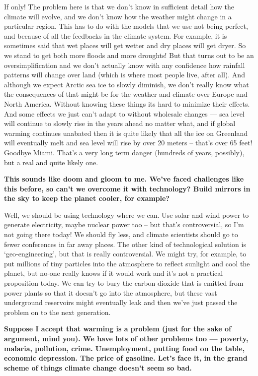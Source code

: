 \documentclass[11pt]{article}
\begin{document}
If only! The problem here is that we don't know in sufficient detail how
the climate will evolve, and we don't know how the weather might change
in a particular region. This has to do with the models that we use not
being perfect, and because of all the feedbacks in the climate system.
For example, it is sometimes said that wet places will get wetter and
dry places will get dryer. So we stand to get both more floods and more
droughts! But that turns out to be an oversimplification and we don't
actually know with any confidence how rainfall patterns will change over
land (which is where most people live, after all). And although we
expect Arctic sea ice to slowly diminish, we don't really know what the
consequences of that might be for the weather and climate over Europe
and North America. Without knowing these things its hard to minimize
their effects. And some effects we just can't adapt to without wholesale
changes --- sea level will continue to slowly rise in the years ahead no
matter what, and if global warming continues unabated then it is quite
likely that all the ice on Greenland will eventually melt and sea level
will rise by over 20 meters -- that's over 65 feet! Goodbye Miami.
That's a very long term danger (hundreds of years, possibly), but a real
and quite likely one.

\textbf{\color{navy} This sounds like doom and gloom to me. We've faced challenges
like this before, so can't we overcome it with technology? Build mirrors
in the sky to keep the planet cooler, for example?}

Well, we should be using technology where we can. Use solar and wind
power to generate electricity, maybe nuclear power too -- but that's
controversial, so I'm not going there today! We should fly less, and
climate scientists should go to fewer conferences in far away places.
The other kind of technological solution is `geo-engineering', but that
is really controversial. We might try, for example, to put millions of
tiny particles into the atmosphere to reflect sunlight and cool the
planet, but no-one really knows if it would work and it's not a
practical proposition today. We can try to bury the carbon dioxide that
is emitted from power plants so that it doesn't go into the atmosphere,
but these vast underground reservoirs might eventually leak and then
we've just passed the problem on to the next generation.

\textbf{\color{navy} Suppose I accept that warming is a problem (just for the sake of
argument, mind you). We have lots of other problems too --- poverty,
malaria, pollution, crime. Unemployment, putting food on the table,
economic depression. The price of gasoline. Let's face it, in the grand
scheme of things climate change doesn't seem so bad.}
\end{document}
